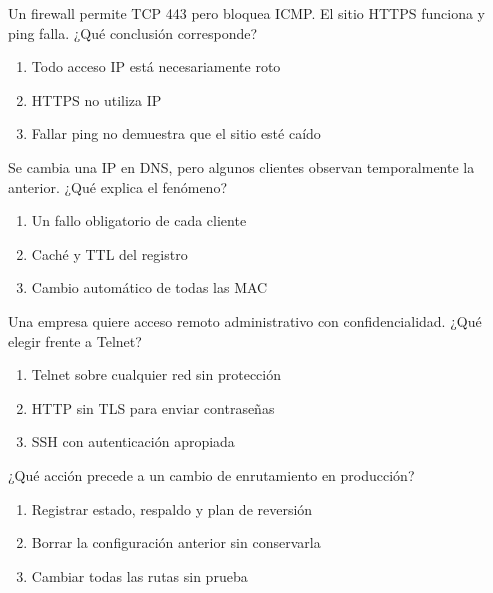 \noindent\begin{minipage}{\linewidth}\setlength{\parskip}{4pt}\label{q:R-044}
Un firewall permite TCP 443 pero bloquea ICMP. El sitio HTTPS funciona y ping falla. ¿Qué conclusión corresponde?
\begin{enumerate}[label=\Alph*),nosep]
\item Todo acceso IP está necesariamente roto
\item HTTPS no utiliza IP
\item Fallar ping no demuestra que el sitio esté caído
\end{enumerate}\end{minipage}\par\medskip

\noindent\begin{minipage}{\linewidth}\setlength{\parskip}{4pt}\label{q:R-045}
Se cambia una IP en DNS, pero algunos clientes observan temporalmente la anterior. ¿Qué explica el fenómeno?
\begin{enumerate}[label=\Alph*),nosep]
\item Un fallo obligatorio de cada cliente
\item Caché y TTL del registro
\item Cambio automático de todas las MAC
\end{enumerate}\end{minipage}\par\medskip

\noindent\begin{minipage}{\linewidth}\setlength{\parskip}{4pt}\label{q:R-046}
Una empresa quiere acceso remoto administrativo con confidencialidad. ¿Qué elegir frente a Telnet?
\begin{enumerate}[label=\Alph*),nosep]
\item Telnet sobre cualquier red sin protección
\item HTTP sin TLS para enviar contraseñas
\item SSH con autenticación apropiada
\end{enumerate}\end{minipage}\par\medskip

\noindent\begin{minipage}{\linewidth}\setlength{\parskip}{4pt}\label{q:R-047}
¿Qué acción precede a un cambio de enrutamiento en producción?
\begin{enumerate}[label=\Alph*),nosep]
\item Registrar estado, respaldo y plan de reversión
\item Borrar la configuración anterior sin conservarla
\item Cambiar todas las rutas sin prueba
\end{enumerate}\end{minipage}\par\medskip

